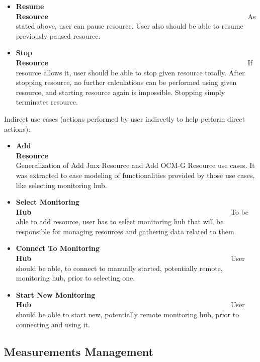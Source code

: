 \begin{itemize}
 \item {\bf Resume Resource}~~~~~~~~~~~~~~~~~~~~~~~~~~~~~~~~~~~~~~~~~~~~~~~~~~~~~~~~\linebreak
As stated above, user can pause resource. User also should be able to resume previously paused resource.

 \item {\bf Stop Resource}~~~~~~~~~~~~~~~~~~~~~~~~~~~~~~~~~~~~~~~~~~~~~~~~~~~~~~~~\linebreak
If resource allows it, user should be able to stop given resource totally. After stopping resource, no further
calculations can be performed using given resource, and starting resource again is impossible. Stopping simply
terminates resource.
\end{itemize}

Indirect use cases (actions performed by user indirectly to help perform direct actions):

\begin{itemize}

 \item {\bf Add Resource}~~~~~~~~~~~~~~~~~~~~~~~~~~~~~~~~~~~~~~~~~~~~~~~~~~~~~~~~\linebreak
Generalization of Add Jmx Resource and Add OCM-G Resource use cases. It was extracted to ease modeling of
functionalities provided by those use cases, like selecting monitoring hub.

 \item {\bf Select Monitoring Hub}~~~~~~~~~~~~~~~~~~~~~~~~~~~~~~~~~~~~~~~~~~~~~~~~~~~~~~~~\linebreak
To be able to add resource, user has to select monitoring hub that will be responsible for managing resources
and gathering data related to them.

 \item {\bf Connect To Monitoring Hub}~~~~~~~~~~~~~~~~~~~~~~~~~~~~~~~~~~~~~~~~~~~~~~~~~~~~~~~~\linebreak
User should be able, to connect to manually started, potentially remote, monitoring hub, prior to selecting one.

 \item {\bf Start New Monitoring Hub}~~~~~~~~~~~~~~~~~~~~~~~~~~~~~~~~~~~~~~~~~~~~~~~~~~~~~~~~\linebreak
User should be able to start new, potentially remote monitoring hub, prior to connecting and using it.
\end{itemize}

\subsection{Measurements Management}
\label{subsec:measurement_mgmnt}


